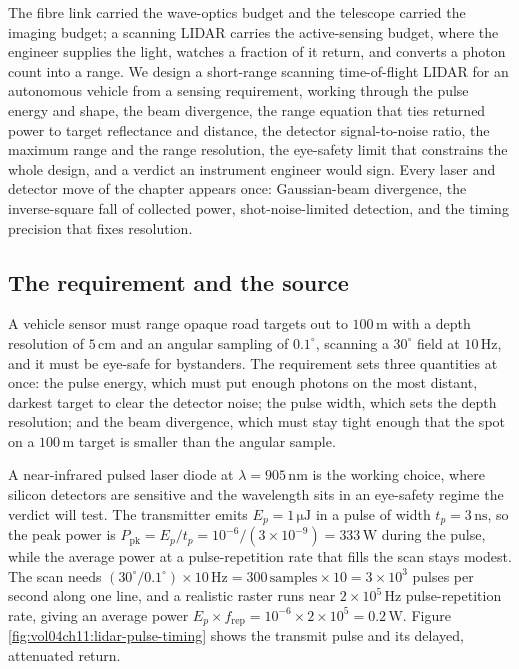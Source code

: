 The fibre link carried the wave-optics budget and the telescope carried the
imaging budget; a scanning LIDAR carries the active-sensing budget, where the
engineer supplies the light, watches a fraction of it return, and converts a
photon count into a range. We design a short-range scanning time-of-flight
LIDAR for an autonomous vehicle from a sensing requirement, working through
the pulse energy and shape, the beam divergence, the range equation that ties
returned power to target reflectance and distance, the detector
signal-to-noise ratio, the maximum range and the range resolution, the
eye-safety limit that constrains the whole design, and a verdict an instrument
engineer would sign. Every laser and detector move of the chapter appears once:
Gaussian-beam divergence, the inverse-square fall of collected power,
shot-noise-limited detection, and the timing precision that fixes resolution.

\subsection{The requirement and the source}

A vehicle sensor must range opaque road targets out to $100\,\si{\meter}$ with
a depth resolution of $5\,\si{\centi\meter}$ and an angular sampling of
$0.1^{\circ}$, scanning a $30^{\circ}$ field at $10\,\si{\hertz}$, and it must
be eye-safe for bystanders. The requirement sets three quantities at once: the
pulse energy, which must put enough photons on the most distant, darkest target
to clear the detector noise; the pulse width, which sets the depth resolution;
and the beam divergence, which must stay tight enough that the spot on a
$100\,\si{\meter}$ target is smaller than the angular sample.

A near-infrared pulsed laser diode at $\lambda = 905\,\si{\nano\meter}$ is the
working choice, where silicon detectors are sensitive and the wavelength sits
in an eye-safety regime the verdict will test. The transmitter emits
$E_{p} = 1\,\si{\micro\joule}$ in a pulse of width
$t_{p} = 3\,\si{\nano\second}$, so the peak power is
$P_{\text{pk}} = E_{p}/t_{p} = 10^{-6}/(3\times10^{-9}) = 333\,\si{\watt}$
during the pulse, while the average power at a pulse-repetition rate that fills
the scan stays modest. The scan needs
$(30^{\circ}/0.1^{\circ})\times 10\,\si{\hertz} = 300\,\text{samples}\times
10 = 3\times10^{3}$ pulses per second along one line, and a realistic raster
runs near $2\times10^{5}\,\si{\hertz}$ pulse-repetition rate, giving an average
power $E_{p}\times f_{\text{rep}} = 10^{-6}\times 2\times10^{5} =
0.2\,\si{\watt}$. Figure \ref{fig:vol04ch11:lidar-pulse-timing} shows the
transmit pulse and its delayed, attenuated return.

